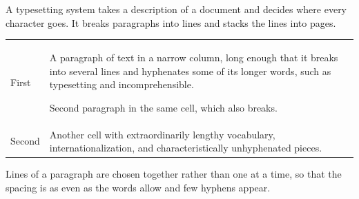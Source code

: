 \documentclass{article}
\begin{document}
A typesetting system takes a description of a document and decides where every character goes. It breaks paragraphs into lines and stacks the lines into pages.

\begin{tabular}{l p{4cm}}
First & A paragraph of text in a narrow column, long enough that it breaks into several lines and hyphenates some of its longer words, such as typesetting and incomprehensible.

Second paragraph in the same cell, which also breaks. \\
Second & Another cell with extraordinarily lengthy vocabulary, internationalization, and characteristically unhyphenated pieces. \\
\end{tabular}

Lines of a paragraph are chosen together rather than one at a time, so that the spacing is as even as the words allow and few hyphens appear.
\end{document}
